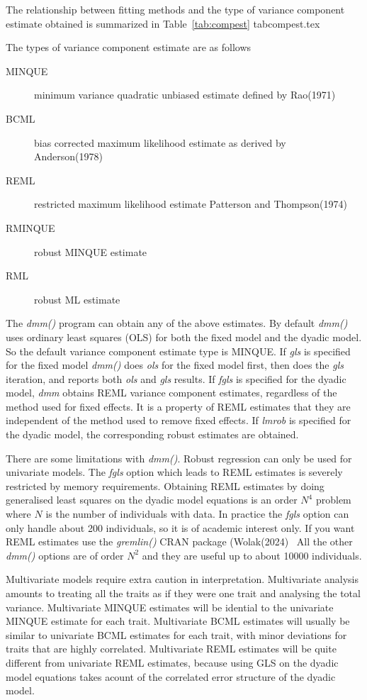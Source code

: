 \documentclass[titlepage,a4paper,12pt]{article}  %
\begin{document}
The relationship between  fitting methods and the type of variance component estimate obtained is summarized in Table~\ref{tab:compest}
 {tabcompest.tex}

The types of variance component estimate are as follows
\begin{description}
\item[MINQUE] minimum variance quadratic unbiased estimate defined by Rao(1971)~\cite{rao:71}
\item[BCML] bias corrected maximum likelihood estimate as derived by Anderson(1978)~\cite{ande:78}
\item[REML] restricted maximum likelihood estimate Patterson and Thompson(1974)~\cite{patt:74}
\item[RMINQUE] robust MINQUE estimate
\item[RML] robust ML estimate
\end{description}

The {\em dmm()} program can obtain any of the above estimates. By default {\em dmm()} uses ordinary least squares (OLS) for both the fixed model and the dyadic model. So the default variance component estimate type is MINQUE. If {\em gls} is specified for the fixed model {\em dmm()} does {\em ols} for the fixed model first, then does the {\em gls} iteration, and reports both {\em ols} and {\em gls} results.  If {\em fgls} is specified for the dyadic model, {\em dmm} obtains REML variance component estimates, regardless of the method used for fixed effects. It is a property of REML estimates that they are independent of the method used to remove fixed effects. If {\em lmrob} is specified for the dyadic model, the corresponding robust estimates are obtained. 

There are some limitations with {\em dmm()}. Robust regression can only be used for univariate models. The {\em fgls} option which leads to REML estimates is severely restricted by memory requirements. Obtaining REML estimates by doing generalised least squares on the dyadic model equations is an order $N^{4}$ problem where $N$ is the number of individuals with data.  In practice the {\em fgls} option can only handle about 200 individuals, so it is of academic interest only. If you want REML estimates use the {\em gremlin()} CRAN package (Wolak(2024)~\cite{wola:24} All the other {\em dmm()} options are of order $N^{2}$ and they are useful up to about 10000 individuals.

Multivariate models require extra caution in interpretation. Multivariate analysis amounts to treating all the traits as if they were one trait and analysing the total variance. Multivariate MINQUE estimates will be idential to the univariate MINQUE estimate for each trait. Multivariate BCML estimates will usually be similar to univariate BCML estimates for each trait, with minor deviations for traits that are highly correlated. Multivariate REML estimates will be quite different from univariate REML estimates, because using GLS on the dyadic model equations takes acount of the correlated error structure of the dyadic model.
\end{document}
